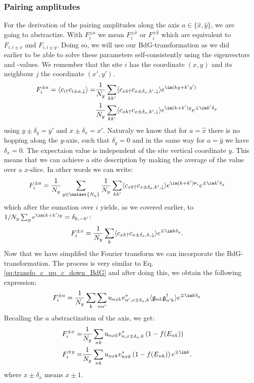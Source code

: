 \documentclass[../main.tex]{subfile}
\begin{document}
\subsubsection{Pairing amplitudes}
For the derivation of the pairing amplitudes along the axis $a\in\{\hat{x},\hat{y}\}$, we are going to abstractize.
With $F_i^{\pm a}$ we mean $F_i^{\pm \hat{x}}$ or $F_i^{\pm \hat{y}}$ which are equivalent to $F_{i,i\pm x}$ and $F_{i,i\pm y}$.
Doing so, we will use our BdG-transformation as we did earlier to be 
able to solve these parameters self-consistently using the eigenvectors and -values. We remember that the site $i$ has the coordinate $(x,y)$ and its neighbour $j$
the coordinate $(x',y')$.
\begin{align*}
    F_i^{\pm a} = \langle c_{i\uparrow} c_{i\pm a,\downarrow}\rangle =& \frac{1}{N_y} \sum_{kk'} \langle c_{x k\uparrow} c_{x\pm \delta_x,k',\downarrow} \rangle e^{\im(ky + k'y')}\\
                                                                    &   \frac{1}{N_y} \sum_{kk'} \langle c_{x k\uparrow} c_{x\pm \delta_x,k',\downarrow} \rangle e^{\im(k + k')y} e^{\pm\im k' \delta_y}
\end{align*}
using $y\pm \delta_y = y'$ and $x\pm \delta_x = x'$. Naturaly we know that for $a = \hat{x}$ there is no hopping along the $y$-axis, such that $\delta_y=0$ and in the same way for $a = \hat{y}$ we have $\delta_x = 0$.
The expectaion value is independent of the site vertical coordinate $y$. This means that we can achieve a site description 
by making the average of the value over a $x$-slice. In other words
we can write:
\begin{equation*}
    F^{\pm a}_i = 
    \frac{1}{N_y}\sum_{y\in\natset{N_y}} \frac{1}{N_y} \sum_{kk'} \langle c_{x k\uparrow} c_{x \pm \delta_x,k',\downarrow} \rangle e^{\im(k + k')\bm{r}_i} e^{\pm\im k'\delta_y}
\end{equation*}
which after the sumation over $i$ yields, as we covered earlier, to $1/N_y \sum_{y} e^{\im(k + k')y} = \delta_{k,-k'}$:
\begin{equation*}
    F^{\pm x}_i = 
    \frac{1}{N_y} \sum_{k} \langle c_{x k\uparrow} c_{x\pm \delta_x,k,\downarrow} \rangle e^{\mp\im k\delta_y}.
\end{equation*}
Now that we have simplifed the Fourier transform we can incorporate the BdG-transformation. The process is very similar to Eq.\ref{eq:transfo_c_up_c_down_BdG} and after doing this,
we obtain the following expression:
\begin{equation}\label{eq:transfo_F_x}
    F^{\pm a}_i =\frac{1}{N_y}\sum_{k}\sum_{nn'} u_{nx k}v_{n',x \pm \delta_x,k}^{\ast} \langle \mathfrak{g}_{nk} \mathfrak{g}_{n'k}^{\dagger} \rangle e^{\mp\im k \delta_y}
\end{equation}
Recalling the $a$ abstractization of the axis, we get:
\begin{align}
    F^{\pm x}_i =& \frac{1}{N_y} \sum_{nk} u_{nx k} v_{n,x\pm \delta_x,k}^{\ast}\left(1 - f(E_{nk})\right)\\
    F^{\pm y}_i =& \frac{1}{N_y} \sum_{nk} u_{nx k} v_{n x k}^{\ast}\left(1 - f(E_{nk})\right) e^{\mp \im k}.
\end{align}
where $x\pm \delta_x$ means $x\pm1$.
\end{document}
